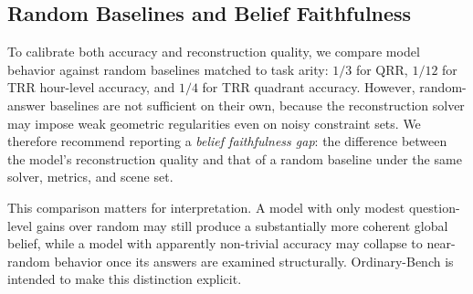 \subsection{Random Baselines and Belief Faithfulness}
\label{sec:baselines}

To calibrate both accuracy and reconstruction quality, we compare model behavior against random baselines matched to task arity: $1/3$ for QRR, $1/12$ for TRR hour-level accuracy, and $1/4$ for TRR quadrant accuracy. However, random-answer baselines are not sufficient on their own, because the reconstruction solver may impose weak geometric regularities even on noisy constraint sets. We therefore recommend reporting a \emph{belief faithfulness gap}: the difference between the model's reconstruction quality and that of a random baseline under the same solver, metrics, and scene set.

This comparison matters for interpretation. A model with only modest question-level gains over random may still produce a substantially more coherent global belief, while a model with apparently non-trivial accuracy may collapse to near-random behavior once its answers are examined structurally. Ordinary-Bench is intended to make this distinction explicit.
